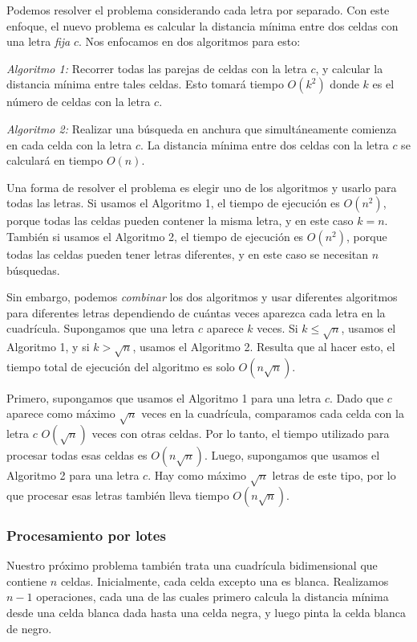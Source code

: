 Podemos resolver el problema considerando cada letra por separado.
Con este enfoque, el nuevo problema es calcular
la distancia mínima
entre dos celdas con una letra \emph{fija} $c$.
Nos enfocamos en dos algoritmos para esto:

\emph{Algoritmo 1:} Recorrer todas las parejas de celdas con la letra $c$,
y calcular la distancia mínima entre tales celdas.
Esto tomará tiempo $O(k^2)$ donde $k$ es el número de celdas con la letra $c$.

\emph{Algoritmo 2:} Realizar una búsqueda en anchura que simultáneamente
comienza en cada celda con la letra $c$. La distancia mínima entre
dos celdas con la letra $c$ se calculará en tiempo $O(n)$.

Una forma de resolver el problema es elegir uno de los
algoritmos y usarlo para todas las letras.
Si usamos el Algoritmo 1, el tiempo de ejecución es $O(n^2)$,
porque todas las celdas pueden contener la misma letra,
y en este caso $k=n$.
También si usamos el Algoritmo 2, el tiempo de ejecución es $O(n^2)$,
porque todas las celdas pueden tener letras diferentes,
y en este caso se necesitan $n$ búsquedas.

Sin embargo, podemos \emph{combinar} los dos algoritmos y
usar diferentes algoritmos para diferentes letras
dependiendo de cuántas veces aparezca cada letra en la cuadrícula.
Supongamos que una letra $c$ aparece $k$ veces.
Si $k \le \sqrt n$, usamos el Algoritmo 1, y si $k > \sqrt n$,
usamos el Algoritmo 2.
Resulta que al hacer esto, el tiempo total de ejecución
del algoritmo es solo $O(n \sqrt n)$.

Primero, supongamos que usamos el Algoritmo 1 para una letra $c$.
Dado que $c$ aparece como máximo $\sqrt n$ veces en la cuadrícula,
comparamos cada celda con la letra $c$ $O(\sqrt n)$ veces
con otras celdas.
Por lo tanto, el tiempo utilizado para procesar todas esas celdas es $O(n \sqrt n)$.
Luego, supongamos que usamos el Algoritmo 2 para una letra $c$.
Hay como máximo $\sqrt n$ letras de este tipo,
por lo que procesar esas letras también lleva tiempo $O(n \sqrt n)$.

\subsubsection{Procesamiento por lotes}

Nuestro próximo problema también trata
una cuadrícula bidimensional que contiene $n$ celdas.
Inicialmente, cada celda excepto una es blanca.
Realizamos $n-1$ operaciones, cada una de las cuales primero
calcula la distancia mínima desde una celda blanca dada
hasta una celda negra, y luego pinta la celda blanca de negro.

